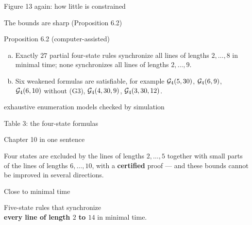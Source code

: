 \begin{frame}{Figure 13 again: how little is constrained}
\centering\fig[0.78]{}
\end{frame}

\begin{frame}{The bounds are sharp (Proposition 6.2)}
\begin{statement}{Proposition 6.2 (computer-assisted)}
\begin{enumerate}[(a)]
\item Exactly $27$ partial four-state rules synchronize all lines of lengths $2,\dots,8$ in minimal time; none synchronizes all lines of lengths $2,\dots,9$.
\item Six weakened formulas are satisfiable, for example $\mathcal G_4(5,30)$, $\mathcal G_4(6,9)$, $\mathcal G_4(6,10)$ without (G3), $\mathcal G_4(4,30,9)$, $\mathcal G_4(3,30,12)$.
\end{enumerate}
\end{statement}
\small {} exhaustive enumeration \qquad models checked by simulation
\end{frame}

\begin{frame}{Table 3: the four-state formulas}
\centering\fig[0.70]{}
\end{frame}

\begin{frame}{Chapter 10 in one sentence}
\vspace{4ex}
\begin{plainbox}\large
Four states are excluded by the lines of lengths $2,\dots,5$ together with small parts of the lines of lengths $6,\dots,10$, with a \textbf{certified} proof --- and these bounds cannot be improved in several directions.
\end{plainbox}
\end{frame}


\begin{frame}{Close to minimal time}
\vspace{5ex}
\begin{center}\Large
Five-state rules that synchronize\\ \textbf{every line of length $2$ to $14$} in minimal time.
\end{center}
\end{frame}

